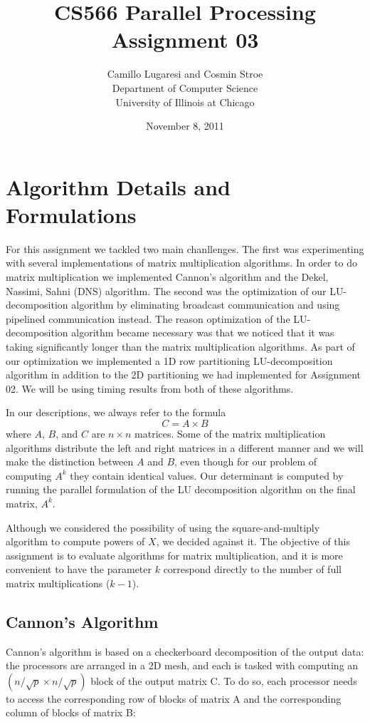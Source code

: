\documentclass{article}
\title{CS566 Parallel Processing \\ Assignment 03}
\author{Camillo Lugaresi and Cosmin Stroe \vspace{20pt} \\ Department of Computer Science \\
University of Illinois at Chicago}
\date{November 8, 2011}
\begin{document}
\maketitle
\newpage

\section{Algorithm Details and Formulations}

For this assignment we tackled two main chanllenges.  The first was
experimenting with several implementations of matrix multiplication algorithms. 
In order to do matrix multiplication we implemented Cannon's algorithm and the
Dekel, Nassimi, Sahni (DNS) algorithm.  The second was the optimization of our
LU-decomposition algorithm by eliminating broadcast communication and using
pipelined communication instead.  The reason optimization of the
LU-decomposition algorithm became necessary was that we noticed that it was
taking significantly longer than the matrix multiplication algorithms.  As part
of our optimization we implemented a 1D row partitioning LU-decomposition
algorithm in addition to the 2D partitioning we had implemented for
Assignment 02.  We will be using timing results from both of these algorithms.

In our descriptions, we always refer to the formula $$C = A \times B$$ where
$A$, $B$, and $C$ are $n \times n$ matrices.  Some of the matrix multiplication
algorithms distribute the left and right matrices in a different manner and we
will make the distinction between $A$ and $B$, even though for our problem of
computing $A^k$ they contain identical values.  Our determinant is computed by
running the parallel formulation of the LU decomposition algorithm on the final
matrix, $A^k$.

Although we considered the possibility of using the square-and-multiply algorithm to compute powers of $X$, we decided against it. The objective of this assignment is to evaluate algorithms for matrix multiplication, and it is more convenient to have the parameter $k$ correspond directly to the number of full matrix multiplications ($k-1$).


\subsection{Cannon's Algorithm}

Cannon's algorithm is based on a checkerboard decomposition of the output data: the processors are arranged in a 2D mesh, and each is tasked with computing an $(n/\sqrt{p} \times n/\sqrt{p})$ block of the output matrix C.
To do so, each processor needs to access the corresponding row of blocks of matrix A and the corresponding column of blocks of matrix B:
\end{document}
